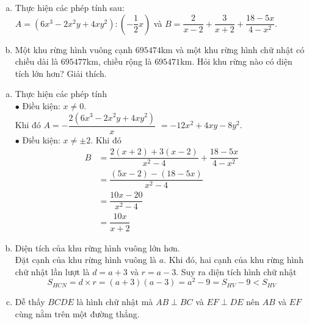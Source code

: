 \begin{ex}%
	\hfill
\begin{enumerate}[a)]
	\item Thực hiện các phép tính sau:\\
	$A=(6x^3-2x^2y+4xy^2):\left(-\dfrac{1}{2}x\right)$ và $B=\dfrac{2}{x-2}+\dfrac{3}{x+2}+\dfrac{18-5x}{4-x^2}$.
	\item Một khu rừng hình vuông cạnh $695474$km và một khu rừng hình chữ nhật có chiều dài là $695477$km, chiều rộng là $695471$km. Hỏi khu rừng nào có diện tích lớn hơn? Giải thích.
{
}
\end{enumerate}
	\loigiai
	{
	\begin{enumerate}[a)]
		\item Thực hiện các phép tính\\
			$\bullet$ 		Điều kiện: $x\ne 0$.\\ Khi đó $A=-\dfrac{2(6x^3-2x^2y+4xy^2)}{x}$ $=-12x^2+4xy-8y^2$.\\
			$\bullet$ Điều kiện: $x\ne \pm2$. Khi đó \\ 
		$$
		\begin{aligned}
		B&=\dfrac{2(x+2)+3(x-2)}{x^2-4}+\dfrac{18-5x}{4-x^2}\\ &=
		\dfrac{(5x-2)-(18-5x)}{x^2-4}\\& =\dfrac{10x-20}{x^2-4}\\& =\dfrac{10x}{x+2}
		\end{aligned}$$	
		\item Diện tích của khu rừng hình vuông lớn hơn.\\ Đặt cạnh của khu rừng hình vuông là $a$. Khi đó, hai cạnh của khu rừng hình chữ nhật lần lượt là $d=a+3$ và $r=a-3$. Suy ra diện tích hình chữ nhật $$S_{HCN}=d\times r=(a+3)(a-3)=a^2-9=S_{HV}-9< S_{HV}$$	
		\item Dễ thấy $BCDE$ là hình chữ nhật mà $AB\perp BC$ và $EF\perp DE$ nên $AB$ và $EF$ cùng nằm trên một đường thẳng.
	\end{enumerate}	
}
\end{ex}
